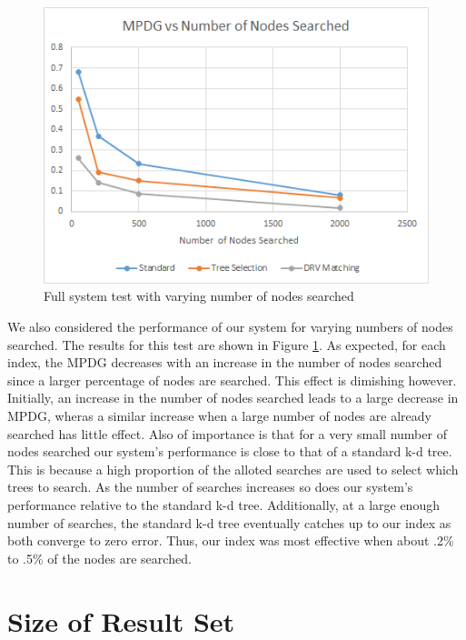 \begin{figure}[h]
\begin{center}
\includegraphics[width=.85\textwidth]{Figures/nsearch}
\end{center}
\caption{Full system test with varying number of nodes searched}
\label{fig:nsearch}
\end{figure}

We also considered the performance of our system for varying numbers of nodes searched.  The results for this test are shown in Figure \ref{fig:nsearch}.  As expected, for each index, the MPDG decreases with an increase in the number of nodes searched since a larger percentage of nodes are searched.  This effect is dimishing however.  Initially, an increase in the number of nodes searched leads to a large decrease in MPDG, wheras a similar increase when a large number of nodes are already searched has little effect.  Also of importance is that for a very small number of nodes searched our system's performance is close to that of a standard k-d tree.  This is because a high proportion of the alloted searches are used to select which trees to search.  As the number of searches increases so does our system's performance relative to the standard k-d tree.  Additionally, at a large enough number of searches, the standard k-d tree eventually catches up to our index as both converge to zero error.  Thus, our index was most effective when about .2\% to .5\% of the nodes are searched.

\section{Size of Result Set}

